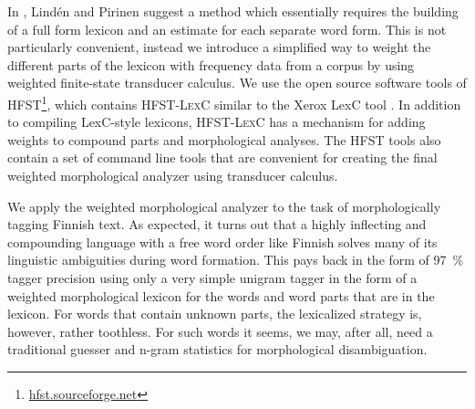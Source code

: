 \documentclass[postprint]{flammie}
\begin{document}

In \cite{linden09nodalida}, Lindén and Pirinen suggest a method which
essentially requires the building of a full form lexicon and an
estimate for each separate word form. This is not particularly
convenient, instead we introduce a simplified way to weight the
different parts of the lexicon with frequency data from a corpus by
using weighted finite-state transducer calculus. We use the open
source software tools of
\textsc{HFST}\footnote{\url{hfst.sourceforge.net}}, which contains
\textsc{HFST-LexC} similar to the Xerox LexC tool
\cite{beesley2004}. In addition to compiling LexC-style lexicons,
\textsc{HFST-LexC} has a mechanism for adding weights to compound
parts and morphological analyses. The \textsc{HFST} tools also contain
a set of command line tools that are convenient for creating the final
weighted morphological analyzer using transducer calculus.

We apply the weighted morphological analyzer to the task of
morphologically tagging Finnish text. As expected, it turns out that a
highly inflecting and compounding language with a free word order like
Finnish solves many of its linguistic ambiguities during word
formation. This pays back in the form of 97~\% tagger precision using
only a very simple unigram tagger in the form of a weighted
morphological lexicon for the words and word parts that are in the
lexicon. For words that contain unknown parts, the lexicalized
strategy is, however, rather toothless. For such words it seems, we
may, after all, need a traditional guesser and n-gram statistics for
morphological disambiguation.
\end{document}
